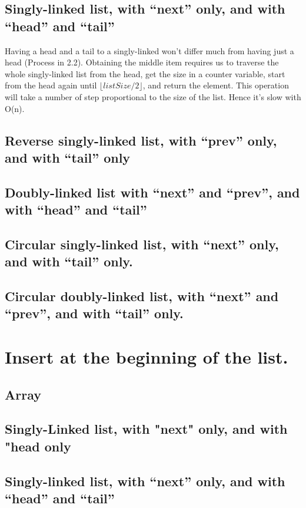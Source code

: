 \documentclass{article}
\begin{document}
\subsection{Singly-linked list, with “next” only, and with “head” and “tail”}
Having a head and a tail to a singly-linked won't differ much from having just a head (Process in 2.2). Obtaining the middle item requires us to traverse the whole singly-linked list from the head, get the size in a counter variable, start from the head again until $\lfloor {listSize/2} \rfloor$, and return the element. This operation will take a number of step proportional to the size of the list. Hence it's slow with O(n).


\subsection{Reverse singly-linked list, with “prev” only, and with “tail” only}

\subsection{Doubly-linked list with “next” and “prev”, and with “head” and “tail”}

\subsection{Circular singly-linked list, with “next” only, and with “tail” only.}

\subsection{Circular doubly-linked list, with “next” and “prev”, and with “tail” only.}


\section{Insert at the beginning of the list.}
\subsection{Array}
\subsection{Singly-Linked list, with "next" only, and with "head only}
\subsection{Singly-linked list, with “next” only, and with “head” and “tail”}
\end{document}
